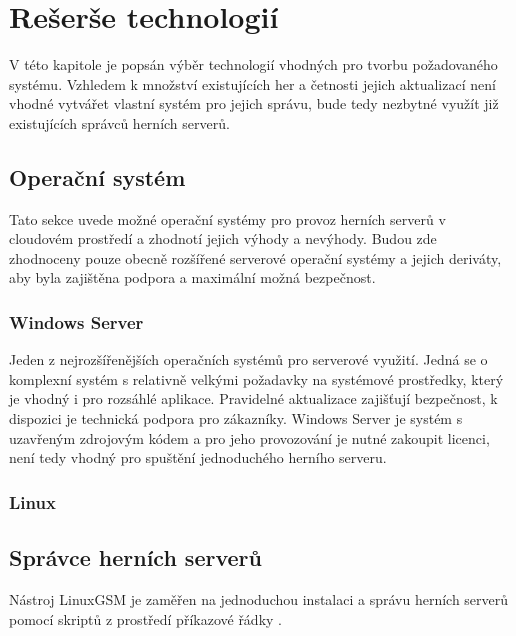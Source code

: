 \chapter{Rešerše technologií}

V této kapitole je popsán výběr technologií vhodných pro tvorbu požadovaného systému.
Vzhledem k množství existujících her a četnosti jejich aktualizací není vhodné vytvářet vlastní
systém pro jejich správu, bude tedy nezbytné využít již existujících správců herních serverů.

\section{Operační systém}

Tato sekce uvede možné operační systémy pro provoz herních serverů v cloudovém prostředí a zhodnotí
jejich výhody a nevýhody. Budou zde zhodnoceny pouze obecně rozšířené serverové operační systémy \cite{server_os_share} a jejich deriváty,
aby byla zajištěna podpora a maximální možná bezpečnost.

\subsection{Windows Server}

Jeden z nejrozšířenějších operačních systémů pro serverové využití. Jedná se o komplexní systém s relativně velkými požadavky na
systémové prostředky, který je vhodný i pro rozsáhlé aplikace. Pravidelné aktualizace zajišťují bezpečnost, k dispozici je technická
podpora pro zákazníky. Windows Server je systém s uzavřeným zdrojovým kódem a pro jeho provozování je nutné zakoupit licenci,
není tedy vhodný pro spuštění jednoduchého herního serveru.

\subsection{Linux}



\section{Správce herních serverů}
Nástroj LinuxGSM je zaměřen na jednoduchou instalaci a správu herních serverů pomocí skriptů z prostředí příkazové řádky \cite{linuxgsm}. 